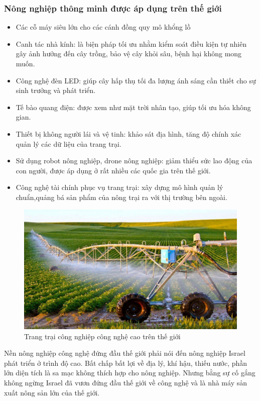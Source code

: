 \subsubsection{Nông nghiệp thông minh được áp dụng trên thế giới}
\begin{itemize}
	\item Các cỗ máy siêu lớn cho các cánh đồng quy mô khổng lồ 
	\item Canh tác nhà kính: là biện pháp tối ưu nhằm kiểm soát điều kiện tự nhiên gây ảnh hưởng đến cây trồng, bảo vệ cây khỏi sâu, bệnh hại không mong muốn.
	\item Công nghệ đèn LED: giúp cây hấp thụ tối đa lượng ánh sáng cần thiết cho sự sinh trưởng và phát triển.
	\item Tế bào quang điện: được xem như mặt trời nhân tạo, giúp tối ưu hóa không gian.
	\item Thiết bị không người lái và vệ tinh: khảo sát địa hình, tăng độ chính xác quản lý các dữ liệu của trang trại.
	\item Sử dụng robot nông nghiệp, drone nông nghiệp: giảm thiểu sức lao động của con người, được áp dụng ở rất nhiều các quốc gia trên thế giới. 
	\item Công nghệ tài chính phục vụ trang trại:  xây dựng mô hình quản lý chuẩn,quảng bá sản phẩm của nông trại ra với thị trường bên ngoài.
\end{itemize}
\begin{figure}[H]
	\centering
	\includegraphics[scale=.3]{Chapter 1/image chapter 1/tuoitieu.jpg}
	\caption[Trang trại công nghiệp công nghệ cao trên thế giới]{Trang trại công nghiệp công nghệ cao trên thế giới}
\end{figure}
\indent Nền nông nghiệp công nghệ đứng đầu thế giới phải nói đến nông nghiệp Israel phát triển ở trình độ cao. Bất chấp bất lợi về địa lý, khí hậu, thiếu nước, phần lớn diện tích là sa mạc không thích hợp cho nông nghiệp. Nhưng bằng sự cố gắng không ngừng Israel đã vươn đứng đầu thế giới về công nghệ và là nhà máy sản xuất nông sản lớn của thế giới.
